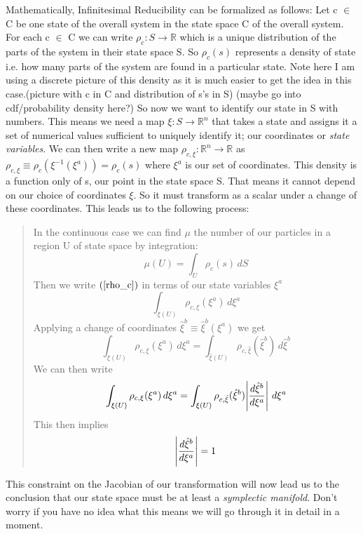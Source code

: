 \documentclass{article}
\begin{document}
	Mathematically, Infinitesimal Reducibility can be formalized as follows: Let c $\in$ C be one state of the overall system in the state space C of the overall system. For each c $\in$ C we can write $\rho_c: S \rightarrow \mathbb{R}$ which is a unique distribution of the parts of the system in their state space S. So $\rho_c(s)$ represents a density of state i.e. how many parts of the system are found in a particular state. Note here I am using a discrete picture of this density as it is much easier to get the idea in this case.(picture with c in C and distribution of s's in S) (maybe go into cdf/probability density here?) So now we want to identify our state in S with numbers. This means we need a map $\xi : S \rightarrow \mathbb{R}^n $ that takes a state and assigns it a set of numerical values sufficient to uniquely identify it; our coordinates or \textit{state variables}. We can then write a new map $\rho_{c,\xi} : \mathbb{R}^n \rightarrow \mathbb{R}$ as $\rho_{c,\xi} \equiv \rho_c(\xi^{-1}(\xi^a)) = \rho_c(s)$ where $\xi^a$ is our set of coordinates. This density is a function only of s, our point in the state space S. That means it cannot depend on our choice of coordinates $\xi$. So it must transform as a scalar under a change of these coordinates. This leads us to the following process:
	
\begin{quote}
In the continuous case we can find $\mu$ the number of our particles in a region U of state space by integration:
	\begin{equation}
	\label{rho_c}
	\mu(U) = \int_{U} \rho_c(s)\, dS
	\end{equation}
Then we write $(\ref{rho_c})$ in terms of our state variables $\xi^a$ 
	\begin{equation}
	\label{rho_xia}
	\int_{\xi(U)} \rho_{c,\xi}(\xi^a) \, d\xi^a
	\end{equation}
Applying a change of coordinates $\hat{\xi}^b \equiv \hat{\xi}^b(\xi^a)$ we get
	\begin{equation}
	\label{rho_xib}
	\int_{\xi(U)} \rho_{c,\xi}(\xi^a) \, d\xi^a = \int_{\hat{\xi}(U)} \rho_{c,\hat{\xi}}(\hat{\xi}^b) \, d\hat{\xi}^b
	\end{equation}
We can then write
	\begin{equation}
	\label{rho_J}
	\int_{\xi(U)} \rho_{c,\xi}(\xi^a) \, d\xi^a = \int_{\xi(U)} \rho_{c,\hat{\xi}}(\hat{\xi}^b) \abs{\frac{d\hat{\xi}^b}{d\xi^a}} \, d\xi^a
	\end{equation}
This then implies
	\begin{equation}
	\label{}
	\abs{\frac{d\hat{\xi}^b}{d\xi^a}} = 1
	\end{equation}
\end{quote}
This constraint on the Jacobian of our transformation will now lead us to the conclusion that our state space must be at least a \textit{symplectic manifold}. Don't worry if you have no idea what this means we will go through it in detail in a moment.
\end{document}
